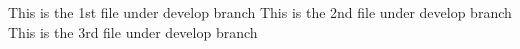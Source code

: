This is the 1st file under develop branch
This is the 2nd file under develop branch
This is the 3rd file under develop branch
